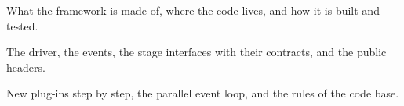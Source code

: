 \documentclass{simcpp}
\begin{document}
\simcfrontmatter



\simcmainmatter

  {What the framework is made of, where the code lives, and how it is built and tested.}



  {The driver, the events, the stage interfaces with their contracts, and the public headers.}


  {New plug-ins step by step, the parallel event loop, and the rules of the code base.}



\simcbackmatter
\end{document}
